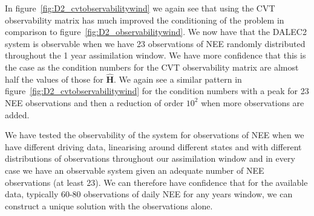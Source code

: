 \documentclass[11pt]{article}
\begin{document}
In figure~\ref{fig:D2_cvtobservabilitywind} we again see that using the CVT observability matrix has much improved the conditioning of the problem in comparison to figure~\ref{fig:D2_observabilitywind}. We now have that the DALEC2 system is observable when we have 23 observations of NEE randomly distributed throughout the 1 year assimilation window. We have more confidence that this is the case as the condition numbers for the CVT observability matrix are almost half the values of those for $\hat{\textbf{H}}$. We again see a similar pattern in figure~\ref{fig:D2_cvtobservabilitywind} for the condition numbers with a peak for 23 NEE observations and then a reduction of order $10^{2}$ when more observations are added. 

We have tested the observability of the system for observations of NEE when we have different driving data, linearising around different states and with different distributions of observations throughout our assimilation window and in every case we have an observable system given an adequate number of NEE observations (at least 23). We can therefore have confidence that for the available data, typically 60-80 observations of daily NEE for any years window, we can construct a unique solution with the observations alone.
\end{document}
